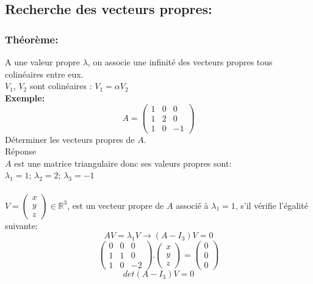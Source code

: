 \documentclass[a4paper,12pt,french]{article}
\begin{document}
	
	\subsection{Recherche des vecteurs propres:}
	\subsubsection{Théorème:}
	A une valeur propre $\lambda$, on associe une infinité des vecteurs propres tous colinéaires entre eux.\\ $V_{1}$, $V_{2}$ sont colinéaires : $V_{1}=\alpha V_{2}$\\
	\textbf{Exemple:}
	\[A=\begin{pmatrix}
		1 & 0 & 0  \\
		1 & 2 & 0 \\
		1 & 0 & -1
		
	\end{pmatrix}\] 
	Déterminer les vecteurs propres de $A$.\\
	Réponse\\
	$A$ est une matrice triangulaire donc ses valeurs propres sont:\\
	$\lambda_{1}=1$; $\lambda_{2}=2$; $\lambda_{3}=-1$\\\\
	$V=\begin{pmatrix}
		x  \\
		y  \\
		z
		
	\end{pmatrix} \in \mathbb{R}^{3}$, est un vecteur propre de $A$ associé à $\lambda_{1}=1$, s'il vérifie l'égalité suivante:\\
	\[AV=\lambda_{1}V \rightarrow (A-I_{3})V=0\] 
	\[\begin{pmatrix}
		0 & 0 & 0  \\
		1 & 1 & 0 \\
		1 & 0 & -2
		
	\end{pmatrix}.\begin{pmatrix}
		x   \\
		y   \\
		z 
		
	\end{pmatrix}=\begin{pmatrix}
		0   \\
		0  \\
		0 
		
	\end{pmatrix}\] 
	\[det(A-I_{3})V=0\]
\end{document}
